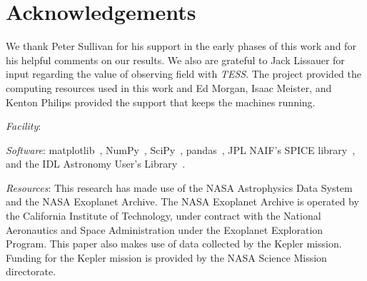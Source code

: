 \section*{Acknowledgements}
We thank Peter Sullivan for his support in the early phases of this work and for his helpful comments on our results.
We also are grateful to Jack Lissauer for input regarding the value of observing \keplers field with \textit{TESS}.
The \tess project provided the computing resources used in this work and Ed Morgan, Isaac Meister, and Kenton Philips provided the support that keeps the machines running.

\vspace{0.5cm}
\textit{Facility}: \tess

\textit{Software}: matplotlib~\citep{hunter_matplotlib_2007}, NumPy~\citep{walt_numpy_2011}, SciPy~\citep{jones_scipy_2001}, pandas~\citep{mckinneypandas}, JPL NAIF's SPICE library~\citep{acton_SPICE_1996}, and the IDL Astronomy User's Library~\citep{landsman_idl_1995}.

\textit{Resources}: This research has made use of the NASA Astrophysics Data System and the NASA Exoplanet Archive. The NASA Exoplanet Archive is operated by the California Institute of Technology, under contract with the National Aeronautics and Space Administration under the Exoplanet Exploration Program.
This paper also makes use of data collected by the Kepler mission. Funding for the Kepler mission is provided by the NASA Science Mission directorate.

